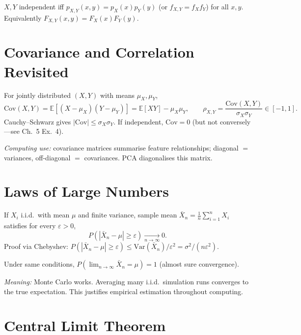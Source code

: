 \begin{definition}[Independence] $X,Y$ independent iff $p_{X,Y}(x,y)=p_X(x)p_Y(y)$ (or $f_{X,Y}=f_Xf_Y$) for all $x,y$. Equivalently $F_{X,Y}(x,y)=F_X(x)F_Y(y)$.
\end{definition}

\section{Covariance and Correlation Revisited}
\label{sec:cov-joint}
For jointly distributed $(X,Y)$ with means $\mu_X,\mu_Y$,
\[
\mathrm{Cov}(X,Y)=\mathbb{E}[(X-\mu_X)(Y-\mu_Y)]=\mathbb{E}[XY]-\mu_X\mu_Y,\qquad
\rho_{X,Y}=\frac{\mathrm{Cov}(X,Y)}{\sigma_X\sigma_Y}\in[-1,1].
\]
Cauchy--Schwarz gives $|\mathrm{Cov}|\le\sigma_X\sigma_Y$. If independent, $\mathrm{Cov}=0$ (but not conversely---see Ch.~5 Ex.~4).

\emph{Computing use:} covariance matrices summarise feature relationships; diagonal $=$ variances, off-diagonal $=$ covariances. PCA diagonalises this matrix.

\section{Laws of Large Numbers}
\label{sec:lln}

\begin{theorem} If $X_i$ i.i.d.\ with mean $\mu$ and finite variance, sample mean $\bar X_n=\frac1n\sum_{i=1}^n X_i$ satisfies for every $\varepsilon>0$,
\[
P(|\bar X_n-\mu|\ge\varepsilon)\xrightarrow[n\to\infty]{}0.
\]
Proof via Chebyshev: $P(|\bar X_n-\mu|\ge\varepsilon)\le\mathrm{Var}(\bar X_n)/\varepsilon^2=\sigma^2/(n\varepsilon^2)$.
\end{theorem}

\begin{theorem} Under same conditions, $P(\lim_{n\to\infty}\bar X_n=\mu)=1$ (almost sure convergence).
\end{theorem}

\emph{Meaning:} Monte Carlo works. Averaging many i.i.d.\ simulation runs converges to the true expectation. This justifies empirical estimation throughout computing.

\section{Central Limit Theorem}
\label{sec:clt}

